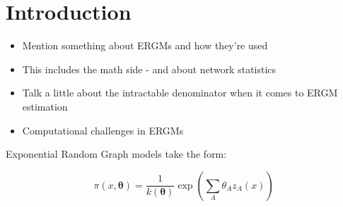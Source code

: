 \section{Introduction}

\begin{itemize}
\item Mention something about ERGMs and how they're used
\item This includes the math side - and about network statistics
\item Talk a little about the intractable denominator when it comes to ERGM estimation
\item Computational challenges in ERGMs
\end{itemize}

Exponential Random Graph models take the form:

\begin{equation}
\pi(x, \boldsymbol{\theta}) = \frac{1}{k(\boldsymbol{\theta})}\exp{\left(\sum_A{\theta_Az_A(x)}\right)}
\end{equation}